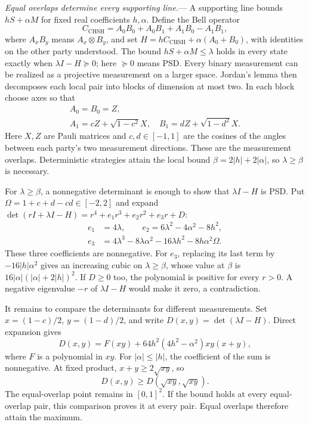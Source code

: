 \documentclass[aps,prl,reprint,superscriptaddress,nofootinbib,longbibliography]{revtex4-2}
\begin{document}
\emph{Equal overlaps determine every supporting line.}---
A supporting line bounds $hS+\alpha M$ for fixed real coefficients
$h,\alpha$. Define the Bell operator
\[
 C_{\mathrm{CHSH}}=A_0B_0+A_0B_1+A_1B_0-A_1B_1,
\]
where $A_xB_y$ means $A_x\otimes B_y$, and set
$H=hC_{\mathrm{CHSH}}+\alpha(A_0+B_0)$, with identities on the other party
understood. The bound $hS+\alpha M\le\lambda$ holds in every state
exactly when $\lambda I-H\succeq0$; here $\succeq0$ means PSD.
Every binary measurement can be realized as a projective measurement
on a larger space. Jordan's lemma then decomposes each local pair into
blocks of dimension at most two. In each block choose axes so that
\begin{equation}
\begin{gathered}
A_0=B_0=Z,\\
 A_1=cZ+\sqrt{1-c^2}X,\quad
 B_1=dZ+\sqrt{1-d^2}X.
\end{gathered}
 \label{eq:angles}
\end{equation}
Here $X,Z$ are Pauli matrices and $c,d\in[-1,1]$ are the cosines
of the angles between each party's two measurement directions. These
are the measurement overlaps. Deterministic strategies attain the
local bound $\beta=2|h|+2|\alpha|$, so $\lambda\ge\beta$ is necessary.

For $\lambda\ge\beta$, a nonnegative determinant is enough to show
that $\lambda I-H$ is PSD. Put $\Omega=1+c+d-cd\in[-2,2]$ and expand
$\det(rI+\lambda I-H)=r^4+e_1r^3+e_2r^2+e_3r+D$:
\begin{equation}
\begin{aligned}
 e_1&=4\lambda,\qquad e_2=6\lambda^2-4\alpha^2-8h^2,\\
 e_3&=4\lambda^3-8\lambda\alpha^2-16\lambda h^2
       -8h\alpha^2\Omega .
\end{aligned}
 \label{eq:coeff}
\end{equation}
These three coefficients are nonnegative. For $e_3$, replacing its
last term by $-16|h|\alpha^2$ gives an increasing cubic on
$\lambda\ge\beta$, whose value at $\beta$ is
$16|\alpha|(|\alpha|+2|h|)^2$.
If $D\ge0$ too, the polynomial is positive for every $r>0$. A negative
eigenvalue $-r$ of $\lambda I-H$ would make it zero, a contradiction.

It remains to compare the determinants for different measurements. Set $x=(1-c)/2$, $y=(1-d)/2$, and write
$D(x,y)=\det(\lambda I-H)$. Direct expansion gives
\begin{equation}
 D(x,y)=F(xy)+64h^2(4h^2-\alpha^2)xy(x+y),
 \label{eq:det}
\end{equation}
where $F$ is a polynomial in $xy$. For $|\alpha|\le|h|$,
the coefficient of the sum is nonnegative. At fixed product,
$x+y\ge2\sqrt{xy}$, so
\begin{equation}
 D(x,y)\ge D(\sqrt{xy},\sqrt{xy}).
 \label{eq:agm}
\end{equation}
The equal-overlap point remains in $[0,1]^2$. If the bound holds at every equal-overlap pair, this comparison proves
it at every pair. Equal overlaps therefore attain the maximum.
\end{document}
